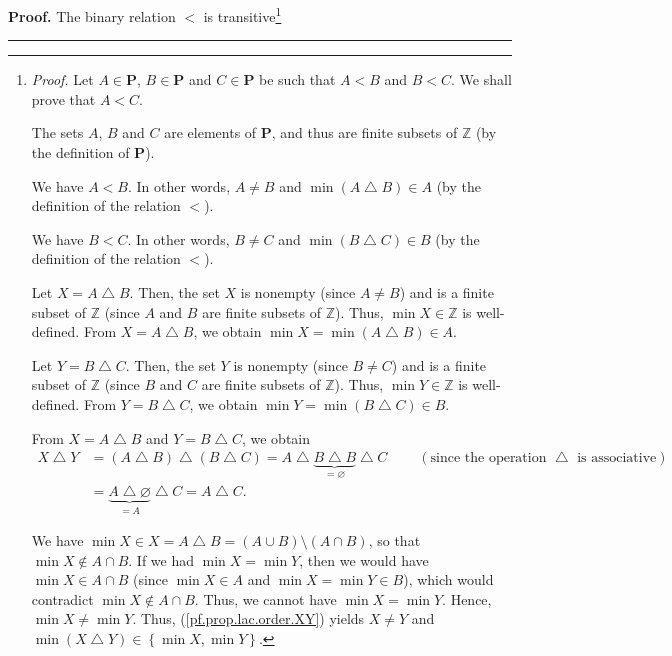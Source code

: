 \documentclass[numbers=enddot,12pt,final,onecolumn,notitlepage]{scrartcl}%
\theoremstyle{definition}
\newenvironment{proof}[1][Proof]{\noindent\textbf{#1.} }{\ \rule{0.5em}{0.5em}}
\newenvironment{verlong}{}{}
\begin{document}
\begin{verlong}
\begin{proof}
The binary relation $<$ is transitive\footnote{\textit{Proof.} Let
$A\in\mathbf{P}$, $B\in\mathbf{P}$ and $C\in\mathbf{P}$ be such that $A<B$ and
$B<C$. We shall prove that $A<C$.
\par
The sets $A$, $B$ and $C$ are elements of $\mathbf{P}$, and thus are finite
subsets of $\mathbb{Z}$ (by the definition of $\mathbf{P}$).
\par
We have $A<B$. In other words, $A\neq B$ and $\min\left(  A\bigtriangleup
B\right)  \in A$ (by the definition of the relation $<$).
\par
We have $B<C$. In other words, $B\neq C$ and $\min\left(  B\bigtriangleup
C\right)  \in B$ (by the definition of the relation $<$).
\par
Let $X=A\bigtriangleup B$. Then, the set $X$ is nonempty (since $A\neq B$) and
is a finite subset of $\mathbb{Z}$ (since $A$ and $B$ are finite subsets of
$\mathbb{Z}$). Thus, $\min X\in\mathbb{Z}$ is well-defined. From
$X=A\bigtriangleup B$, we obtain $\min X=\min\left(  A\bigtriangleup B\right)
\in A$.
\par
Let $Y=B\bigtriangleup C$. Then, the set $Y$ is nonempty (since $B\neq C$) and
is a finite subset of $\mathbb{Z}$ (since $B$ and $C$ are finite subsets of
$\mathbb{Z}$). Thus, $\min Y\in\mathbb{Z}$ is well-defined. From
$Y=B\bigtriangleup C$, we obtain $\min Y=\min\left(  B\bigtriangleup C\right)
\in B$.
\par
From $X=A\bigtriangleup B$ and $Y=B\bigtriangleup C$, we obtain%
\begin{align*}
X\bigtriangleup Y  &  =\left(  A\bigtriangleup B\right)  \bigtriangleup\left(
B\bigtriangleup C\right)  =A\bigtriangleup\underbrace{B\bigtriangleup
B}_{=\varnothing}\bigtriangleup C\ \ \ \ \ \ \ \ \ \ \left(  \text{since the
operation }\bigtriangleup\text{ is associative}\right) \\
&  =\underbrace{A\bigtriangleup\varnothing}_{=A}\bigtriangleup
C=A\bigtriangleup C.
\end{align*}
\par
We have $\min X\in X=A\bigtriangleup B=\left(  A\cup B\right)  \setminus
\left(  A\cap B\right)  $, so that $\min X\notin A\cap B$. If we had $\min
X=\min Y$, then we would have $\min X\in A\cap B$ (since $\min X\in A$ and
$\min X=\min Y\in B$), which would contradict $\min X\notin A\cap B$. Thus, we
cannot have $\min X=\min Y$. Hence, $\min X\neq\min Y$. Thus,
(\ref{pf.prop.lac.order.XY}) yields $X\neq Y$ and $\min\left(  X\bigtriangleup
Y\right)  \in\left\{  \min X,\min Y\right\}  $.
\par
}
\end{proof}
\end{verlong}
\end{document}
